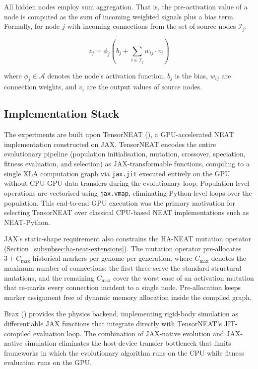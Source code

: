 \documentclass[12pt]{article}
\begin{document}
All hidden nodes employ sum aggregation.
That is, the pre-activation value of a node is computed as the sum of incoming weighted signals plus a bias term.
Formally, for node $j$ with incoming connections from the set of source nodes $\mathcal{I}_j$:

\[z_j = \phi_j\left(b_j + \sum_{i \in \mathcal{I}_j} w_{ij} \cdot v_i\right)\]

where $\phi_j \in \mathcal{A}$ denotes the node's activation function, $b_j$ is the bias, $w_{ij}$ are connection weights, and $v_i$ are the output values of source nodes.

\subsection{Implementation Stack}
\label{subsec:implementation-stack}

The experiments are built upon TensorNEAT (\cite{wang_tensorized_2024}), a GPU-accelerated NEAT implementation constructed on JAX.
TensorNEAT encodes the entire evolutionary pipeline (population initialisation, mutation, crossover, speciation, fitness evaluation, and selection) as JAX-transformable functions, compiling to a single XLA computation graph via \texttt{jax.jit} executed entirely on the GPU without CPU-GPU data transfers during the evolutionary loop.
Population-level operations are vectorised using \texttt{jax.vmap}, eliminating Python-level loops over the population.
This end-to-end GPU execution was the primary motivation for selecting TensorNEAT over classical CPU-based NEAT implementations such as NEAT-Python.

JAX's static-shape requirement also constrains the HA-NEAT mutation operator (Section~\ref{subsubsec:ha-neat-extensions}).
The mutation operator pre-allocates $3 + C_{\max}$ historical markers per genome per generation, where $C_{\max}$ denotes the maximum number of connections: the first three serve the standard structural mutations, and the remaining $C_{\max}$ cover the worst case of an activation mutation that re-marks every connection incident to a single node.
Pre-allocation keeps marker assignment free of dynamic memory allocation inside the compiled graph.

Brax (\cite{freeman_brax_2021}) provides the physics backend, implementing rigid-body simulation as differentiable JAX functions that integrate directly with TensorNEAT's JIT-compiled evaluation loop.
The combination of JAX-native evolution and JAX-native simulation eliminates the host-device transfer bottleneck that limits frameworks in which the evolutionary algorithm runs on the CPU while fitness evaluation runs on the GPU.
\end{document}
